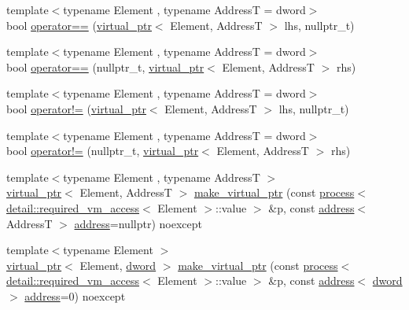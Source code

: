 \begin{DoxyCompactItemize}
\item 
{\footnotesize template$<$typename Element , typename AddressT  = dword$>$ }\\bool \mbox{\hyperlink{namespacedistant_1_1memory_a266da479d4c10610b10d6ad71986cf39}{operator==}} (\mbox{\hyperlink{classdistant_1_1memory_1_1virtual__ptr}{virtual\+\_\+ptr}}$<$ Element, AddressT $>$ lhs, nullptr\+\_\+t)
\item 
{\footnotesize template$<$typename Element , typename AddressT  = dword$>$ }\\bool \mbox{\hyperlink{namespacedistant_1_1memory_a8b98e15c5d137dd94c604799bce5279a}{operator==}} (nullptr\+\_\+t, \mbox{\hyperlink{classdistant_1_1memory_1_1virtual__ptr}{virtual\+\_\+ptr}}$<$ Element, AddressT $>$ rhs)
\item 
{\footnotesize template$<$typename Element , typename AddressT  = dword$>$ }\\bool \mbox{\hyperlink{namespacedistant_1_1memory_a70bc692ecf97f1b944d73cb9499d5afd}{operator!=}} (\mbox{\hyperlink{classdistant_1_1memory_1_1virtual__ptr}{virtual\+\_\+ptr}}$<$ Element, AddressT $>$ lhs, nullptr\+\_\+t)
\item 
{\footnotesize template$<$typename Element , typename AddressT  = dword$>$ }\\bool \mbox{\hyperlink{namespacedistant_1_1memory_a94b18e6bb8f8d8d45be25433fa3f3549}{operator!=}} (nullptr\+\_\+t, \mbox{\hyperlink{classdistant_1_1memory_1_1virtual__ptr}{virtual\+\_\+ptr}}$<$ Element, AddressT $>$ rhs)
\item 
{\footnotesize template$<$typename Element , typename AddressT $>$ }\\\mbox{\hyperlink{classdistant_1_1memory_1_1virtual__ptr}{virtual\+\_\+ptr}}$<$ Element, AddressT $>$ \mbox{\hyperlink{namespacedistant_1_1memory_a960d8c20d10f2451ed596b4de4498bcd}{make\+\_\+virtual\+\_\+ptr}} (const \mbox{\hyperlink{classdistant_1_1kernel__objects_1_1process}{process}}$<$ \mbox{\hyperlink{structdistant_1_1memory_1_1detail_1_1required__vm__access}{detail\+::required\+\_\+vm\+\_\+access}}$<$ Element $>$\+::value $>$ \&p, const \mbox{\hyperlink{classdistant_1_1memory_1_1address}{address}}$<$ AddressT $>$ \mbox{\hyperlink{classdistant_1_1memory_1_1address}{address}}=nullptr) noexcept
\item 
{\footnotesize template$<$typename Element $>$ }\\\mbox{\hyperlink{classdistant_1_1memory_1_1virtual__ptr}{virtual\+\_\+ptr}}$<$ Element, \mbox{\hyperlink{namespacedistant_a9fa41a5a1a17dcbd24da1c1855c92489}{dword}} $>$ \mbox{\hyperlink{namespacedistant_1_1memory_acb30dfca8c04ed8d001247c5073067e0}{make\+\_\+virtual\+\_\+ptr}} (const \mbox{\hyperlink{classdistant_1_1kernel__objects_1_1process}{process}}$<$ \mbox{\hyperlink{structdistant_1_1memory_1_1detail_1_1required__vm__access}{detail\+::required\+\_\+vm\+\_\+access}}$<$ Element $>$\+::value $>$ \&p, const \mbox{\hyperlink{classdistant_1_1memory_1_1address}{address}}$<$ \mbox{\hyperlink{namespacedistant_a9fa41a5a1a17dcbd24da1c1855c92489}{dword}} $>$ \mbox{\hyperlink{classdistant_1_1memory_1_1address}{address}}=0) noexcept

\end{DoxyCompactItemize}

